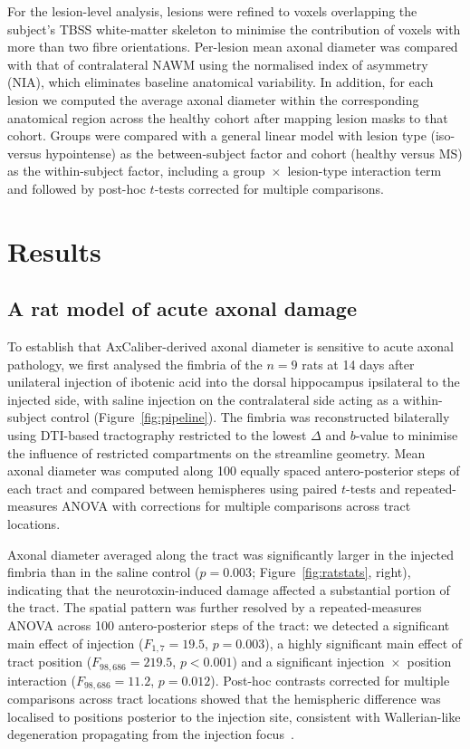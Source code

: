 \documentclass[11pt]{article}
\begin{document}
For the lesion-level analysis, lesions were refined to voxels overlapping the subject's TBSS white-matter skeleton to minimise the contribution of voxels with more than two fibre orientations. Per-lesion mean axonal diameter was compared with that of contralateral NAWM using the normalised index of asymmetry (NIA), which eliminates baseline anatomical variability. In addition, for each lesion we computed the average axonal diameter within the corresponding anatomical region across the healthy cohort after mapping lesion masks to that cohort. Groups were compared with a general linear model with lesion type (iso- versus hypointense) as the between-subject factor and cohort (healthy versus MS) as the within-subject factor, including a group~$\times$~lesion-type interaction term and followed by post-hoc $t$-tests corrected for multiple comparisons.

\section{Results}

\subsection{A rat model of acute axonal damage}

To establish that AxCaliber-derived axonal diameter is sensitive to acute axonal pathology, we first analysed the fimbria of the $n=9$ rats at 14 days after unilateral injection of ibotenic acid into the dorsal hippocampus ipsilateral to the injected side, with saline injection on the contralateral side acting as a within-subject control (Figure~\ref{fig:pipeline}). The fimbria was reconstructed bilaterally using DTI-based tractography restricted to the lowest $\Delta$ and $b$-value to minimise the influence of restricted compartments on the streamline geometry. Mean axonal diameter was computed along 100 equally spaced antero-posterior steps of each tract and compared between hemispheres using paired $t$-tests and repeated-measures ANOVA with corrections for multiple comparisons across tract locations.

Axonal diameter averaged along the tract was significantly larger in the injected fimbria than in the saline control ($p=0.003$; Figure~\ref{fig:ratstats}, right), indicating that the neurotoxin-induced damage affected a substantial portion of the tract. The spatial pattern was further resolved by a repeated-measures ANOVA across 100 antero-posterior steps of the tract: we detected a significant main effect of injection ($F_{1,7}=19.5$, $p=0.003$), a highly significant main effect of tract position ($F_{98,686}=219.5$, $p<0.001$) and a significant injection~$\times$~position interaction ($F_{98,686}=11.2$, $p=0.012$). Post-hoc contrasts corrected for multiple comparisons across tract locations showed that the hemispheric difference was localised to positions posterior to the injection site, consistent with Wallerian-like degeneration propagating from the injection focus~\cite{conforti2014wallerian}.
\end{document}
